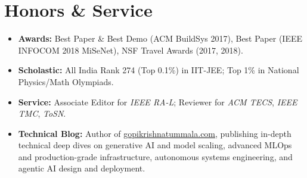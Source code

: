 \documentclass[10pt,letterpaper]{article}
\begin{document}
\section{Honors \& Service}
\begin{itemize}
    \item \textbf{Awards:} Best Paper \& Best Demo (ACM BuildSys 2017), Best Paper (IEEE INFOCOM 2018 MiSeNet), NSF Travel Awards (2017, 2018).
    \item \textbf{Scholastic:} All India Rank 274 (Top 0.1\%) in IIT-JEE; Top 1\% in National Physics/Math Olympiads.
    \item \textbf{Service:} Associate Editor for \textit{IEEE RA-L}; Reviewer for \textit{ACM TECS}, \textit{IEEE TMC}, \textit{ToSN}.
    \item \textbf{Technical Blog:} Author of \href{https://gopikrishnatummala.com/}{gopikrishnatummala.com}, publishing in-depth technical deep dives on generative AI and model scaling, advanced MLOps and production-grade infrastructure, autonomous systems engineering, and agentic AI design and deployment.
\end{itemize}
\end{document}
